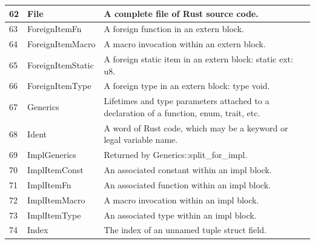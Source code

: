 \begin{longtable}{| p{} | p{} | p{} |}
62    & File                           & A complete file of Rust source code.                                                                           \\ \hline
63    & ForeignItemFn                  & A foreign function in an extern block.                                                                         \\ \hline
64    & ForeignItemMacro               & A macro invocation within an extern block.                                                                     \\ \hline
65    & ForeignItemStatic              & A foreign static item in an extern block: static ext: u8.                                                      \\ \hline
66    & ForeignItemType                & A foreign type in an extern block: type void.                                                                  \\ \hline
67    & Generics                       & Lifetimes and type parameters attached to a declaration of a function, enum, trait, etc.                       \\ \hline
68    & Ident                          & A word of Rust code, which may be a keyword or legal variable name.                                            \\ \hline
69    & ImplGenerics                   & Returned by Generics::split\_for\_impl.                                                                          \\ \hline
70    & ImplItemConst                  & An associated constant within an impl block.                                                                   \\ \hline
71    & ImplItemFn                     & An associated function within an impl block.                                                                   \\ \hline
72    & ImplItemMacro                  & A macro invocation within an impl block.                                                                       \\ \hline
73    & ImplItemType                   & An associated type within an impl block.                                                                       \\ \hline
74    & Index                          & The index of an unnamed tuple struct field.                                                                    \\ \hline

\end{longtable}
